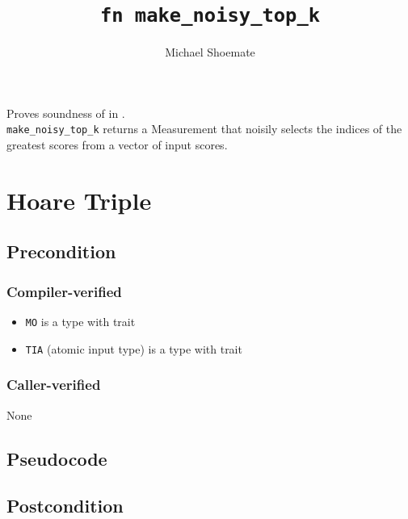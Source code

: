 \documentclass{article}
\title{\texttt{fn make\_noisy\_top\_k}}
\author{Michael Shoemate}
\begin{document}
\maketitle

Proves soundness of 
in .\\
\texttt{make\_noisy\_top\_k} returns a Measurement that
noisily selects the indices of the greatest scores from a vector of input scores.

\section{Hoare Triple}
\subsection*{Precondition}
\subsubsection*{Compiler-verified}
\begin{itemize}
    \item \texttt{MO} is a type with trait 
    \item \texttt{TIA} (atomic input type) is a type with trait 
\end{itemize}

\subsubsection*{Caller-verified}
None

\subsection*{Pseudocode}
\label{sec:python-pseudocode}


\subsection*{Postcondition}

\begin{theorem}
    \label{postcondition}
\end{theorem}
\end{document}

